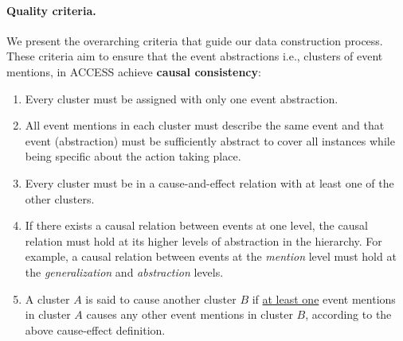 \paragraph{Quality criteria.}
We present the overarching criteria that guide our data construction process. These criteria aim to ensure that the event abstractions i.e., clusters of event mentions, in ACCESS achieve \textbf{causal consistency}:
\begin{enumerate} %
    \item Every cluster must be assigned with only one event abstraction. 
    
    \item All event mentions in each cluster must describe the same event and that event (abstraction) must be sufficiently abstract to cover all instances while being specific about the action taking place. 

    \item Every cluster must be in a cause-and-effect relation with at least one of the other clusters.


    \item If there exists a causal relation between events at one level, the causal relation must hold at its higher levels of abstraction in the hierarchy. For example, a causal relation between events at the \textit{mention} level must hold at the \textit{generalization} and \textit{abstraction} levels.

    \item A cluster $A$ is said to cause another cluster $B$ if \underline{at least one} event mentions in cluster $A$ causes any other event mentions in cluster $B$, according to the above cause-effect definition. 
\end{enumerate}



